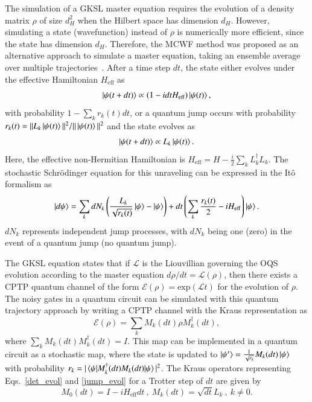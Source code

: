 \documentclass[10pt, superscriptaddress,aps,pra,twocolumn,showpacs,nofootinbib, longbibliography, notitlepage,floatfix]{revtex4-2}
\begin{document}
The simulation of a GKSL master equation requires the evolution of a density matrix $\rho$ of size $d_H^2$ when the Hilbert space has dimension $d_H$. However, simulating a state (wavefunction) instead of $\rho$ is numerically more efficient, since the state has dimension $d_H$. Therefore, the MCWF method was proposed as an alternative approach to simulate a master equation, taking an ensemble average over multiple trajectories~\cite{Dalibard_etal_prl, Carmichael1993Open}. After a time step $dt$, the state either evolves under the effective Hamiltonian $H_{\text{eff}}$ as
\begin{equation}
    \ket{\psi(t + dt )} \propto (1-i dt H_{\text{eff}}) \ket{\psi(t)} \label{det_evol},
\end{equation}
with probability $1 - \sum_k r_k(t) dt $, or a quantum jump occurs with probability $r_k(t) = || L_k \ket{\psi(t)} || ^ 2 / || \ket{\psi(t)} || ^ 2$ and the state evolves as
\begin{equation}
    \ket{\psi(t + dt )} \propto L_k \ket{\psi(t)}.\label{jump_evol}
\end{equation}
Here, the effective non-Hermitian Hamiltonian is $H_{\text{eff}} = H - \frac{i}{2} \sum_k L_k^{\dagger} L_k$. The stochastic Schr\"odinger equation for this unraveling can be expressed in the It\^{o} formalism as  \begin{equation}
    \ket{d\psi} = \sum_k dN_k \left( \frac{~~L_k}{\sqrt{r_k(t)}} \ket{\psi} - \ket{\psi} \right) + dt \left( \sum_k \frac{r_k(t)}{2} - i  H_{\text{eff}}\right) \ket{\psi}.
\end{equation}
$dN_k$ represents independent jump processes, with $dN_k$ being one (zero) in the event of a quantum jump (no quantum jump). 

The GKSL equation states that if $\mathcal{L}$ is the Liouvillian governing the OQS evolution according to the master equation $d\rho / dt = \mathcal{L} (\rho) $, then there exists a CPTP quantum channel of the form $\mathcal{E} (\rho) = \text{exp}(\mathcal{L}t)$ for the evolution of $\rho$. The noisy gates in a quantum circuit can be simulated with this quantum trajectory approach by writing a CPTP channel with the Kraus representation as 
\begin{equation}
    \mathcal{E} (\rho) = \sum_k M_k (dt) \rho M_k ^{\dagger} (dt),
\end{equation}
where $\sum_k M_k(dt) M_k ^{\dagger} (dt) = I$. This map can be implemented in a quantum circuit as a stochastic map, where the state is updated to $\ket{\psi'} = \frac{1}{\sqrt{r_k}} M_k(dt) \ket{\psi}$ with probability $r_k = |\braket{{\psi} | M_k ^{\dagger}(dt) M_k(dt) | {\psi}}|^2$. The Kraus operators representing Eqs.~\eqref{det_evol} and \eqref{jump_evol} for a Trotter step of $d t $ are given by 
\begin{equation}
    M_0(dt) = I -i H_{\text{eff}} dt ~ , ~ M_k(dt) = \sqrt{dt} L_k~, ~ k\neq0.
\end{equation}
\end{document}
